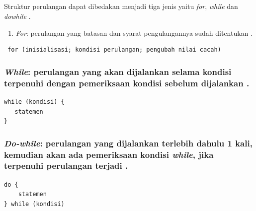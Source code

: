 \documentclass[../main.tex]{subfiles}
\begin{document}
\subsection{{\Looping}}
Struktur perulangan dapat dibedakan menjadi tiga jenis yaitu \textit{for}, \textit{while} dan \textit{dowhile} \parencite{anam2021cara}.

\begin{enumerate}[labelsep=2.8ex]
    \item {\textit{For}: perulangan yang batasan dan syarat pengulangannya sudah ditentukan \parencite{suryadi2018belajar}.}
\end{enumerate}
\vspace{-1ex}
\begin{code}[n]
\begin{verbatim}
 for (inisialisasi; kondisi perulangan; pengubah nilai cacah)
\end{verbatim}
\end{code}

\subsubsection{\textit{While}: perulangan yang akan dijalankan selama kondisi terpenuhi dengan pemeriksaan kondisi sebelum dijalankan \parencite{anam2021cara}.}

\begin{code}[n]
\begin{verbatim}
while (kondisi) {
   statemen
}
\end{verbatim}
\end{code}

\subsubsection{\textit{Do-while}: perulangan yang dijalankan terlebih dahulu 1 kali, kemudian akan ada pemeriksaan kondisi \textit{while}, jika terpenuhi perulangan terjadi \parencite{anam2021cara}.}

\begin{code}[n]
\begin{verbatim}
do {
    statemen
} while (kondisi)
\end{verbatim}
\end{code}
\end{document}
